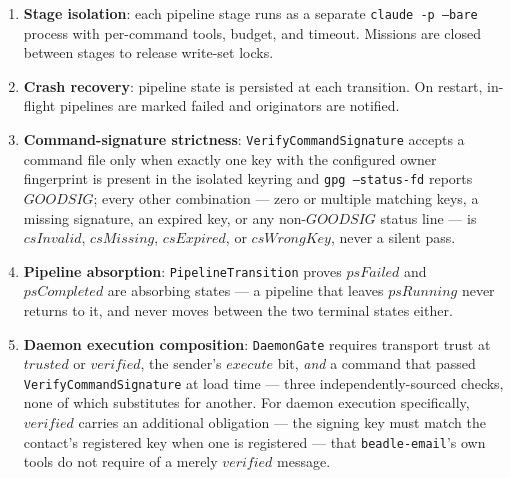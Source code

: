 \documentclass[a4paper,10pt,fleqn]{article}
\begin{document}
\begin{enumerate}
  \item \textbf{Stage isolation}: each pipeline stage runs as a
    separate \texttt{claude -p --bare} process with per-command
    tools, budget, and timeout.  Missions are closed between stages
    to release write-set locks.

  \item \textbf{Crash recovery}: pipeline state is persisted at each
    transition.  On restart, in-flight pipelines are marked failed
    and originators are notified.

  \item \textbf{Command-signature strictness}:
    \texttt{VerifyCommandSignature} accepts a command file only when
    exactly one key with the configured owner fingerprint is
    present in the isolated keyring and \texttt{gpg --status-fd}
    reports $GOODSIG$; every other combination --- zero or multiple
    matching keys, a missing signature, an expired key, or any
    non-$GOODSIG$ status line --- is $csInvalid$, $csMissing$,
    $csExpired$, or $csWrongKey$, never a silent pass.

  \item \textbf{Pipeline absorption}: \texttt{PipelineTransition}
    proves $psFailed$ and $psCompleted$ are absorbing states --- a
    pipeline that leaves $psRunning$ never returns to it, and never
    moves between the two terminal states either.

  \item \textbf{Daemon execution composition}: \texttt{DaemonGate}
    requires transport trust at $trusted$ or $verified$, the
    sender's $execute$ bit, \emph{and} a command that passed
    \texttt{VerifyCommandSignature} at load time --- three
    independently-sourced checks, none of which substitutes for
    another.  For daemon execution specifically, $verified$ carries
    an additional obligation --- the signing key must match the
    contact's registered key when one is registered --- that
    \texttt{beadle-email}'s own tools do not require of a merely
    $verified$ message.
\end{enumerate}
\end{document}

